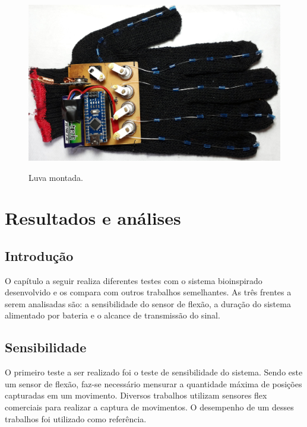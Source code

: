 \documentclass[
	12pt,				%
	openright,			%
	oneside,			%
	a4paper,			%
	english,			%
	brazil				%
	]{abntex2}
\begin{document}
		\begin{figure}[h!]
			\centering
			\caption{Luva montada.}
  		\includegraphics[width=14cm,keepaspectratio=true]{figures/glove-ready1.jpg}
  		\label{Fig:glove-ready1}
		\end{figure}








\chapter{Resultados e análises}

		\section{Introdução}

		O capítulo a seguir realiza diferentes testes com o sistema bioinspirado desenvolvido e os compara com outros trabalhos semelhantes. As três frentes a serem analisadas são: a sensibilidade do sensor de flexão, a duração do sistema alimentado por bateria e o alcance de transmissão do sinal.
		

		\section{Sensibilidade}

		O primeiro teste a ser realizado foi o teste de sensibilidade do sistema. Sendo este um sensor de flexão, faz-se necessário mensurar a quantidade máxima de posições capturadas em um movimento. Diversos trabalhos utilizam sensores flex comerciais para realizar a captura de movimentos. O desempenho de um desses trabalhos foi utilizado como referência.
\end{document}

